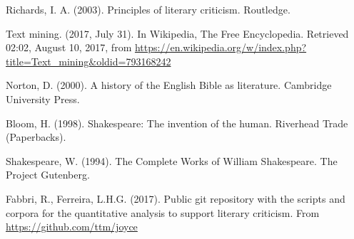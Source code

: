\documentclass[12pt,fleqn]{article}
\begin{document}
\begin{thebibliography}{99}
\fontsize{11}{0}\selectfont
{}
Richards, I. A. (2003). Principles of literary criticism. Routledge.

    Text mining. (2017, July 31). In Wikipedia, The Free Encyclopedia. Retrieved 02:02, August 10, 2017, from \url{https://en.wikipedia.org/w/index.php?title=Text_mining&oldid=793168242}

Norton, D. (2000). A history of the English Bible as literature. Cambridge University Press.

Bloom, H. (1998). Shakespeare: The invention of the human. Riverhead Trade (Paperbacks).

Shakespeare, W. (1994). The Complete Works of William Shakespeare. The Project Gutenberg.

Fabbri, R., Ferreira, L.H.G. (2017). Public git repository with the scripts and corpora for the quantitative analysis to support literary criticism. From \url{https://github.com/ttm/joyce}

\end{thebibliography}





\end{document}
